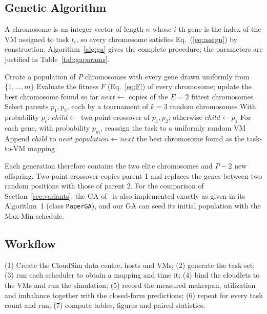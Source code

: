 \documentclass[journal,onecolumn,12pt]{IEEEtran}
\begin{document}
\subsection{Genetic Algorithm}\label{sec:ga}
A chromosome is an integer vector of length $n$ whose $i$-th gene is the index of the VM assigned to task $t_i$, so every chromosome satisfies Eq.~(\ref{eq:assign}) by construction. Algorithm~\ref{alg:ga} gives the complete procedure; the parameters are justified in Table~\ref{tab:gaparams}.

\begin{algorithm}[htbp]
\caption{GA-based task scheduling}\label{alg:ga}
\begin{algorithmic}[1]
\State Create a population of $P$ chromosomes with every gene drawn uniformly from $\{1,\dots,m\}$
  \State Evaluate the fitness $F$ (Eq.~\ref{eq:F}) of every chromosome; update the best chromosome found so far
  \State $\mathit{next} \gets$ copies of the $E=2$ fittest chromosomes 
    \State Select parents $p_1, p_2$, each by a tournament of $k=3$ random chromosomes
    \State With probability $p_c$: $\mathit{child}\gets$ two-point crossover of $p_1,p_2$; otherwise $\mathit{child}\gets p_1$
    \State For each gene, with probability $p_m$, reassign the task to a uniformly random VM
    \State Append $\mathit{child}$ to $\mathit{next}$
  \EndWhile
  \State $\mathit{population}\gets\mathit{next}$
\EndFor
\State \Return the best chromosome found as the task-to-VM mapping
\end{algorithmic}
\end{algorithm}

Each generation therefore contains the two elite chromosomes and $P-2$ new offspring. Two-point crossover copies parent 1 and replaces the genes between two random positions with those of parent 2. For the comparison of Section~\ref{sec:variants}, the GA of~\cite{dehury} is also implemented exactly as given in its Algorithm~1 (class \texttt{PaperGA}), and our GA can seed its initial population with the Max-Min schedule.

\subsection{Workflow}
(1) Create the CloudSim data centre, hosts and VMs; (2) generate the task set; (3) run each scheduler to obtain a mapping and time it; (4) bind the cloudlets to the VMs and run the simulation; (5) record the measured makespan, utilization and imbalance together with the closed-form predictions; (6) repeat for every task count and run; (7) compute tables, figures and paired statistics.
\end{document}

